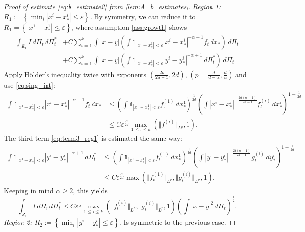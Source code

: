 \documentclass[10pt,oneside]{amsart}
\numberwithin{equation}{section}
\numberwithin{definition}{section}
\numberwithin{theorem}{section}
\numberwithin{lemma}{section}
\begin{document}
\begin{proof}[Proof of estimate \cref{eq:b_estimate2} from \cref{lem:A_b_estimates}]
  \textit{Region 1: $R_{1}:=\left\{ \min_{i}|x^{i}-x_{*}^{i}|\leq\varepsilon\right\}$.} By symmetry, we can reduce it to $R_{1}=\left\{ |x^{1}-x_{*}^{1}|\leq\varepsilon\right\}$, where assumption \ref{ass:growth} shows
  \begin{align}
    \int_{R_{1}}I\,d\Pi_{t}\,d\Pi_{t}^{*}
    & +C\sum_{i=1}^{k}\int|x-y|\left(\int\mathds{1}_{|x^{1}-x_{*}^{1}|<\varepsilon}|x^{i}-x_{*}^{i}|^{-\alpha+1}f_{t}\,dx_{*}\right)\,d\Pi_{t}\nonumber\\
    & +C\sum_{i=1}^{k}\int|x-y|\left(\int\mathds{1}_{|x^{1}-x_{*}^{1}|<\varepsilon}|y^{i}-y_{*}^{i}|^{-\alpha+1}\,d\Pi_{t}^{*}\right)\,d\Pi_{t}.\label{eq:term3_reg1}
  \end{align}
  Apply Hölder's inequality twice with exponents $\left(\frac{2d}{2d-1},2d\right)$, $\left(p=\frac{d}{d-\alpha},\frac{d}{\alpha}\right)$ and use \cref{eq:sing_int}:
  \begin{align*}
    \int\mathds{1}_{|x^{1}-x_{*}^{1}|<\varepsilon}|x^{i}-x_{*}^{i}|^{-\alpha+1}f_{t}\,dx_{*}
    &\leq\left(\int\mathds{1}_{|x^{1}-x_{*}^{1}|<\varepsilon}f_{t}^{(1)}\,dx_{*}^{1}\right)^{\frac{1}{2d}}
    \left(\int|x^{i}-x_{*}^{i}|^{-\frac{2d(\alpha-1)}{2d-1}}f_{t}^{(i)}\,dx_{*}^{i}\right)^{1-\frac{1}{2d}}\\
    &\leq C\varepsilon^{\frac{\alpha}{2d}}\max_{1\leq i\leq k}(\Vert f^{(i)}\Vert_{L^{p}},1).
  \end{align*}
  The third term \cref{eq:term3_reg1} is estimated the same way:
  \begin{align*}
    \int\mathds{1}_{|x^{1}-x_{*}^{1}|<\varepsilon}|y^{i}-y_{*}^{i}|^{-\alpha+1}\,d\Pi_{t}^{*} 
    &\leq\left(\int\mathds{1}_{|x^{1}-x_{*}^{1}|<\varepsilon}f_{t}^{(1)}\,dx_{*}^{1}\right)^{\frac{1}{2d}}
    \left(\int|y^{i}-y_{*}^{i}|^{-\frac{2d(\alpha-1)}{2d-1}}g_{t}^{(i)}\,dy_{*}^{i}\right)^{1-\frac{1}{2d}}	\\
    & \leq C\varepsilon^{\frac{\alpha}{2d}}\max(\Vert f_{t}^{(1)}\Vert _{L^{p}},\Vert g_{t}^{(i)}\Vert _{L^{p}},1).
  \end{align*}
  Keeping in mind $\alpha \geq 2$, this yields
  \begin{equation*}
    \int_{R_{1}}I\,d\Pi_{t}\,d\Pi_{t}^{*}\leq 
    C\varepsilon^{\frac{1}{d}}\max_{1\leq i \leq k}(\Vert f_{t}^{(i)}\Vert _{L^{p}},\Vert g_{t}^{(i)}\Vert _{L^{p}},1)\left(\int|x-y|^2\,d\Pi_t\right)^\frac{1}{2}.
  \end{equation*}
  \textit{Region 2: $R_{2}:=\left\{ \min_{i}|y^{i}-y_{*}^{i}|\leq\varepsilon\right\}$.} Is symmetric to the previous case.


\end{proof}
\end{document}
